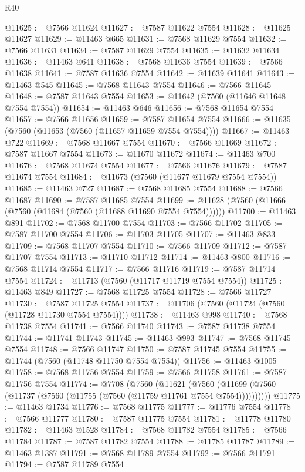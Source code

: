 \begin{lexlean}{R40}
\begin{coremodule}
@11625 := @7566 @11624
@11627 := @7587 @11622 @7554
@11628 := @11625 @11627
@11629 := @11463 @665
@11631 := @7568 @11629 @7554
@11632 := @7566 @11631
@11634 := @7587 @11629 @7554
@11635 := @11632 @11634
@11636 := @11463 @641
@11638 := @7568 @11636 @7554
@11639 := @7566 @11638
@11641 := @7587 @11636 @7554
@11642 := @11639 @11641
@11643 := @11463 @545
@11645 := @7568 @11643 @7554
@11646 := @7566 @11645
@11648 := @7587 @11643 @7554
@11653 := @11642 (@7560 (@11646 @11648 @7554 @7554))
@11654 := @11463 @646
@11656 := @7568 @11654 @7554
@11657 := @7566 @11656
@11659 := @7587 @11654 @7554
@11666 := @11635 (@7560 (@11653 (@7560 (@11657 @11659 @7554 @7554))))
@11667 := @11463 @722
@11669 := @7568 @11667 @7554
@11670 := @7566 @11669
@11672 := @7587 @11667 @7554
@11673 := @11670 @11672
@11674 := @11463 @700
@11676 := @7568 @11674 @7554
@11677 := @7566 @11676
@11679 := @7587 @11674 @7554
@11684 := @11673 (@7560 (@11677 @11679 @7554 @7554))
@11685 := @11463 @727
@11687 := @7568 @11685 @7554
@11688 := @7566 @11687
@11690 := @7587 @11685 @7554
@11699 := @11628 (@7560 (@11666 (@7560 (@11684 (@7560 (@11688 @11690 @7554 @7554))))))
@11700 := @11463 @891
@11702 := @7568 @11700 @7554
@11703 := @7566 @11702
@11705 := @7587 @11700 @7554
@11706 := @11703 @11705
@11707 := @11463 @833
@11709 := @7568 @11707 @7554
@11710 := @7566 @11709
@11712 := @7587 @11707 @7554
@11713 := @11710 @11712
@11714 := @11463 @800
@11716 := @7568 @11714 @7554
@11717 := @7566 @11716
@11719 := @7587 @11714 @7554
@11724 := @11713 (@7560 (@11717 @11719 @7554 @7554))
@11725 := @11463 @849
@11727 := @7568 @11725 @7554
@11728 := @7566 @11727
@11730 := @7587 @11725 @7554
@11737 := @11706 (@7560 (@11724 (@7560 (@11728 @11730 @7554 @7554))))
@11738 := @11463 @998
@11740 := @7568 @11738 @7554
@11741 := @7566 @11740
@11743 := @7587 @11738 @7554
@11744 := @11741 @11743
@11745 := @11463 @993
@11747 := @7568 @11745 @7554
@11748 := @7566 @11747
@11750 := @7587 @11745 @7554
@11755 := @11744 (@7560 (@11748 @11750 @7554 @7554))
@11756 := @11463 @1005
@11758 := @7568 @11756 @7554
@11759 := @7566 @11758
@11761 := @7587 @11756 @7554
@11774 := @7708
    (@7560
      (@11621
        (@7560 (@11699 (@7560 (@11737 (@7560 (@11755 (@7560 (@11759 @11761 @7554 @7554))))))))))
@11775 := @11463 @1734
@11776 := @7568 @11775
@11777 := @11776 @7554
@11778 := @7566 @11777
@11780 := @7587 @11775 @7554
@11781 := @11778 @11780
@11782 := @11463 @1528
@11784 := @7568 @11782 @7554
@11785 := @7566 @11784
@11787 := @7587 @11782 @7554
@11788 := @11785 @11787
@11789 := @11463 @1387
@11791 := @7568 @11789 @7554
@11792 := @7566 @11791
@11794 := @7587 @11789 @7554

\end{coremodule}
\end{lexlean}
